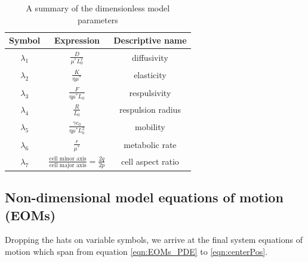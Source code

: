 \begin{table}[!htb]
\begin{center}
    \begin{tabular}{ |c|c|c| } 
     \hline
      \textbf{Symbol} & \textbf{Expression} & \textbf{Descriptive name} \\ 
      \hline
     $\lambda_1$ & $\frac{D}{ \mu^* L_0^2}$ & diffusivity \\ 
     $\lambda_2$ & $\frac{K}{ \eta \mu^*}$ & elasticity \\ 
     $\lambda_3$ & $\frac{F}{  \eta \mu^* L_0}$ & respulsivity \\ 
     $\lambda_4$ & $\frac{R}{L_0}$ & respulsion radius \\ 
     $\lambda_5$ & $\frac{\gamma c_0}{ \eta \mu^* L_0^2}$ & mobility \\ 
     $\lambda_6$ & $\frac{r}{\mu^*}$ & metabolic rate \\ 
     $\lambda_7$ & $\frac{\textrm{cell minor axis}}{\textrm{cell major axis}} = \frac{2q}{2p}$ & cell aspect ratio \\ 
     \hline
     
    \end{tabular}
    
\end{center}
\caption{A summary of the dimensionless model parameters}
\label{table:VariableNames}
\end{table}


\subsection{Non-dimensional model equations of motion (EOMs)}

Dropping the hats on variable symbols, we arrive at the final system equations of motion which
span from equation \ref{eqn:EOMs_PDE} to \ref{eqn:centerPos}.


